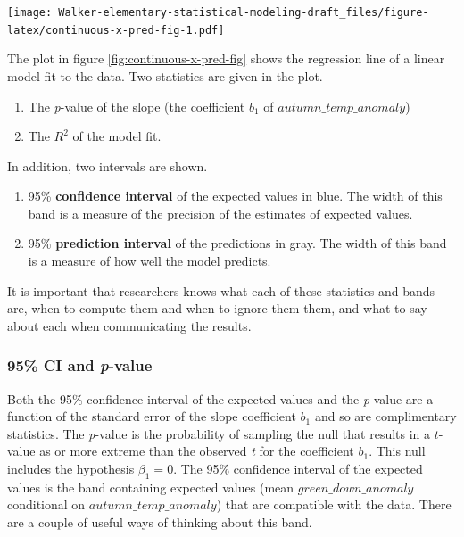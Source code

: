 \documentclass[]{book}
\providecommand{\tightlist}{%
  \setlength{\itemsep}{0pt}\setlength{\parskip}{0pt}}
\begin{document}
\texttt{[image: Walker-elementary-statistical-modeling-draft\_files/figure-latex/continuous-x-pred-fig-1.pdf]}

The plot in figure \ref{fig:continuous-x-pred-fig} shows the regression line of a linear model fit to the data. Two statistics are given in the plot.

\begin{enumerate}
\def\labelenumi{\arabic{enumi}.}
\tightlist
\item
  The \emph{p}-value of the slope (the coefficient \(b_1\) of \(autumn\_temp\_anomaly\))
\item
  The \(R^2\) of the model fit.
\end{enumerate}

In addition, two intervals are shown.

\begin{enumerate}
\def\labelenumi{\arabic{enumi}.}
\tightlist
\item
  95\% \textbf{confidence interval} of the expected values in blue. The width of this band is a measure of the precision of the estimates of expected values.
\item
  95\% \textbf{prediction interval} of the predictions in gray. The width of this band is a measure of how well the model predicts.
\end{enumerate}

It is important that researchers knows what each of these statistics and bands are, when to compute them and when to ignore them them, and what to say about each when communicating the results.

\hypertarget{ci-and-p-value}{%
\subsubsection{\texorpdfstring{95\% CI and \emph{p}-value}{95\% CI and p-value}}\label{ci-and-p-value}}

Both the 95\% confidence interval of the expected values and the \emph{p}-value are a function of the standard error of the slope coefficient \(b_1\) and so are complimentary statistics. The \emph{p}-value is the probability of sampling the null that results in a \(t\)-value as or more extreme than the observed \emph{t} for the coefficient \(b_1\). This null includes the hypothesis \(\beta_1 = 0\). The 95\% confidence interval of the expected values is the band containing expected values (mean \(green\_down\_anomaly\) conditional on \(autumn\_temp\_anomaly\)) that are compatible with the data. There are a couple of useful ways of thinking about this band.
\end{document}

